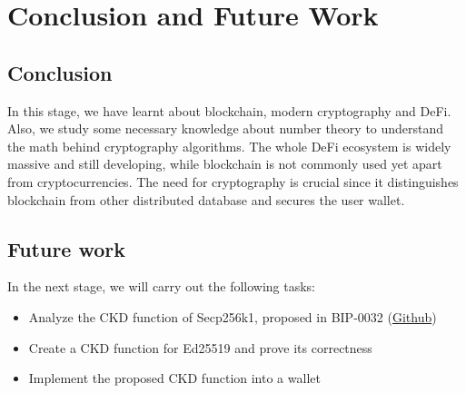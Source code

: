 \chapter{Conclusion and Future Work} \label{chap:conclusion}

\section{Conclusion}

In this stage, we have learnt about blockchain, modern cryptography and DeFi. Also, we study some necessary knowledge about number theory to understand the math behind cryptography algorithms. The whole DeFi ecosystem is widely massive and still developing, while blockchain is not commonly used yet apart from cryptocurrencies. The need for cryptography is crucial since it distinguishes blockchain from other distributed database and secures the user wallet.


\section{Future work}

In the next stage, we will carry out the following tasks:
\begin{itemize}
  \item Analyze the CKD function of Secp256k1, proposed in BIP-0032 (\href{https://github.com/bitcoin/bips/blob/master/bip-0032.mediawiki}{Github})
  \item Create a CKD function for Ed25519 and prove its correctness
  \item Implement the proposed CKD function into a wallet
\end{itemize}